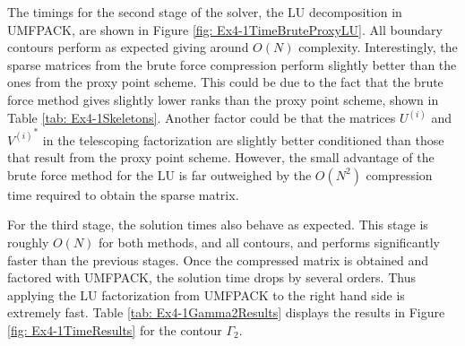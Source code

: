 \documentclass{sfuthesis}
\begin{document}
The timings for the second stage of the solver, the LU decomposition in UMFPACK, are shown in Figure \ref{fig: Ex4-1TimeBruteProxyLU}. All boundary contours perform as expected giving around $O(N)$ complexity. Interestingly, the sparse matrices from the brute force compression perform slightly better than the ones from the proxy point scheme. This could be due to the fact that the brute force method gives slightly lower ranks than the proxy point scheme, shown in Table \ref{tab: Ex4-1Skeletons}. Another factor could be that the matrices $U^{(i)}$ and ${V^{(i)}}^*$ in the telescoping factorization are slightly better conditioned than those that result from the proxy point scheme. However, the small advantage of the brute force method for the LU is far outweighed by the $O(N^2)$ compression time required to obtain the sparse matrix. 

For the third stage, the solution times also behave as expected. This stage is roughly $O(N)$ for both methods, and all contours, and performs significantly faster than the previous stages. Once the compressed matrix is obtained and factored with UMFPACK, the solution time drops by several orders. Thus applying the LU factorization from UMFPACK to the right hand side is extremely fast.  Table \ref{tab: Ex4-1Gamma2Results} displays the results in Figure \ref{fig: Ex4-1TimeResults} for the contour $\Gamma_2$. 
\end{document}
